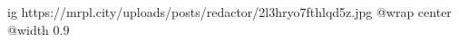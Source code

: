  
 
 
 
 

\ifcmt
  ig https://mrpl.city/uploads/posts/redactor/2l3hryo7fthlqd5z.jpg
  @wrap center
  @width 0.9
\fi
